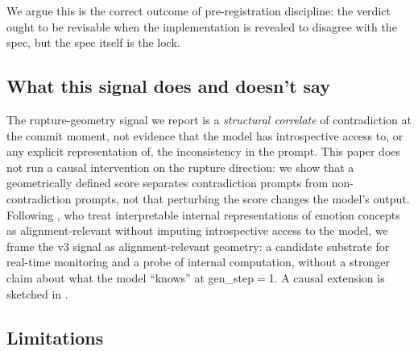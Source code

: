\documentclass[10pt, letterpaper]{article}
\begin{document}
We argue this is the correct
outcome of pre-registration discipline: the verdict ought to be
revisable when the implementation is revealed to disagree with the
spec, but the spec itself is the lock.

\subsection{What this signal does and doesn't say}
\label{sec:disc:claims}

The rupture-geometry signal we report is a \emph{structural correlate}
of contradiction at the commit moment, not evidence that the model has
introspective access to, or any explicit representation of, the
inconsistency in the prompt. This paper does not run a causal
intervention on the rupture direction: we show that a geometrically
defined score separates contradiction prompts from non-contradiction
prompts, not that perturbing the score changes the model's output.
Following \citet{sofroniew2026emotions}, who treat interpretable
internal representations of emotion concepts as alignment-relevant
without imputing introspective access to the model, we frame the v3
signal as alignment-relevant geometry: a candidate substrate for
real-time monitoring and a probe of internal computation, without a
stronger claim about what the model ``knows'' at gen\_step$=$1. A
causal extension is sketched in .

\subsection{Limitations}
\label{sec:disc:limitations}
\end{document}
